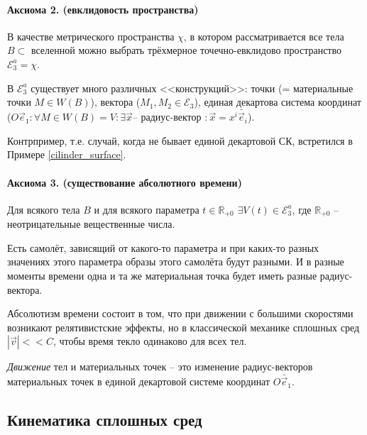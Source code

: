 \paragraph{Аксиома 2. (евклидовость пространства)} В качестве метрического пространства $\chi$,
в котором рассматривается все тела $B \subset$ вселенной можно выбрать трёхмерное 
точечно-евклидово пространство $\mathcal{E}^a_3 = \chi$.

В $\mathcal{E}_3^a$ существует много различных <<конструкций>>: точки (= материальные точки
$M \in W(B)$), вектора ($M_1, M_2 \in \mathcal{E}_3$), единая декартова система координат
($O\vec{e}_1 : \forall M \in W(B)=V : \exists \vec{x} \text{-- радиус-вектор } :
\vec{x} = x^i \bar{\vec{e}}_i$).

\begin{figure}[H]
	\centering
	
\end{figure}

Контрпример, т.е. случай, когда не бывает единой декартовой СК, встретился в Примере \ref{cilinder_surface}.

\paragraph{Аксиома 3. (существование абсолютного времени)} Для всякого тела $B$ и для всякого
параметра $t \in \mathbb{R}_{+0}$ $\exists V(t) \in \mathcal{E}_3^a$, где $\mathbb{R}_{+0}$ --
неотрицательные вещественные числа.

\begin{figure}[H]
	\centering
	
\end{figure}

Есть самолёт, зависящий от какого-то параметра и при каких-то разных значениях этого параметра 
образы этого самолёта будут разными. И в разные моменты времени одна и та же материальная точка
будет иметь разные радиус-вектора.

Абсолютизм времени состоит в том, что при движении с большими скоростями возникают релятивистские 
эффекты, но в классической механике сплошных сред $|\vec{v}| << C$, чтобы время текло одинаково
для всех тел.

\begin{definition}
  \emph{Движение} тел и материальных точек -- это изменение радиус-векторов материальных точек в
  единой декартовой системе координат $O \bar{\vec{e}}_1$.
\end{definition}


\subsection{Кинематика сплошных сред}

